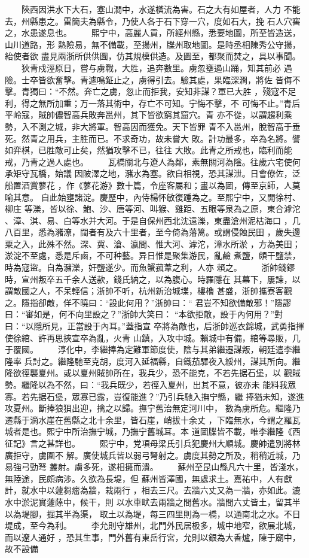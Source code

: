 \documentclass{ctexart}
\begin{document}
　　陝西因洪水下大石，塞山澗中，水遂橫流為害。石之大有如屋者，人力 不能去，州縣患之。雷簡夫為縣令，乃使人各于石下穿一穴，度如石大，挽 石人穴窖之，水患遂息也。 　　熙宁中，高麗人貢，所經州縣，悉要地圖，所至皆造送，山川道路，形 熱險易，無不備載，至揚州，牒州取地圖。是時丞相陳秀公守揚，紿使者欲 盡見兩浙所供供圖，仿其規模供造。及圖至，都聚而焚之，具以事聞。 　　狄青戍涇原日，嘗与虜戰，大胜，追奔數里。虜忽壅遏山踊，知其前必 遇險。士卒皆欲奮擊。青遽鳴鉦止之，虜得引去。驗其處，果臨深澗，將佐 皆侮不擊。青獨曰：``不然。奔亡之虜，忽止而拒我，安知非謀？軍已大胜 ，殘寇不足利，得之無所加重；万一落其術中，存亡不可知。宁悔不擊，不 可悔不止。''青后平岭寇，賊帥儂智高兵敗奔邕州，其下皆欲窮其窟穴。青 亦不從，以謂趨利乘勢，入不測之城，非大將軍。智高因而獲免。天下皆罪 青不入邕州，脫智高于垂死。然青之用兵，主胜而已。不求奇功，故未嘗大 敗。計功最多，卒為名將。譬如弈棋，已胜敵可止矣，然猶攻擊不已，往往 大敗。此青之所戒也，臨利而能戒，乃青之過人處也。 　　瓦橋關北与遼人為鄰，素無關河為陰。往歲六宅使何承矩守瓦橋，始議 因陂澤之地，瀦水為塞。欲自相視，恐其謀泄。日會僚佐，泛船置酒賞蓼花 ，作《蓼花游》數十篇，令座客屬和；畫以為圖，傳至京師，人莫喻其意。 自此始壅諸淀。慶歷中，內侍楊怀敏復踵為之。至熙宁中，又開徐村、柳庄 等濼，皆以徐、鮑、沙、唐等河、叫猴、雞距、五眼等泉為之原，東合滹沱 、漳、淇、易、白等水并大河。于是自保州西北沈遠濼，東盡滄州泥枯海口 ，几八百里，悉為瀦潦，闊者有及六十里者，至今倚為藩篱。或謂侵蝕民田 ，歲失邊粟之入，此殊不然。深、冀、滄、瀛間、惟大河、滹沱，漳水所淤 ，方為美田；淤淀不至處，悉是斥鹵，不可种藝。异日惟是聚集游民，亂鹼 煮鹽，頗干鹽禁，時為寇盜。自為瀦濼，奸鹽遂少。而魚蟹菰葦之利，人亦 賴之。 　　浙帥錢鏐時，宣州叛卒五千余人送款，錢氏納之，以為腹心。時羅隱在 其幕下，屢諫，以謂敵國之人，不呆輕信；浙帥不听，杭州新治城堞，樓櫓 甚盛，浙帥攜寮客觀之。隱指卻敵，佯不曉曰：``設此何用？''浙帥曰：`` 君豈不知欲備敵邪！''隱謬曰：``審如是，何不向里設之？''浙帥大笑曰： ``本欲拒敵，設于內何用？''對曰：``以隱所見，正當設于內耳。''蓋指宣 卒將為敵也，后浙帥巡衣錦城，武勇指揮使徐綰、許再思挾宣卒為亂，火青 山鎮，入攻中城。賴城中有備，綰等尋販，几于覆國。 　　淳化中，李繼捧為定難軍節度使，陰与其弟繼遷謀叛，朝廷遣李繼隆率 兵討之。繼隆馳至克胡，度河入延福縣，自鐵茄驛夜入綏州，謀其所向。繼 隆欲徑襲夏州。或以夏州賊帥所在，我兵少，恐不能克，不若先据石堡，以 觀賊勢。繼隆以為不然，曰：``我兵既少，若徑入夏州，出其不意，彼亦未 能料我眾寡。若先据石堡，眾寡已露，豈復能進？''乃引兵馳入撫宁縣，繼 捧猶未知，遂進攻夏州。斷捧狼狽出迎，擒之以歸。撫宁舊治無定河川中， 數為虜所危。繼隆乃遷縣于滴水崖在舊縣之北十余里，皆石崖，峭拔十余丈 ，下臨無水，今謂之羅瓦城者是也。熙宁中所治撫宁城，乃撫宁舊城耳。本 道圖牒皆不載，唯李繼隆《西征記》言之甚詳也。 　　熙宁中，党項母梁氏引兵犯慶州大順城。慶帥遣別將林廣拒守，虜圍不 解。廣使城兵皆以弱弓弩射之。虜度其勢之所及，稍稍近城，乃易強弓勁弩 叢射。虜多死，遂相擁而潰。 　　蘇州至昆山縣凡六十里，皆淺水，無陸途，民頗病涉。久欲為長堤，但 蘇州皆澤國，無處求土。嘉祐中，人有獻計，就水中以蘧芻癗為牆，栽兩行 ，相去三尺。去牆六丈又為一牆，亦如此。漉水中淤泥實蘧蒢中，候干，則 以水車畎去兩牆之間舊水。牆間六丈皆土，留其半以為堤腳，掘其半為渠， 取土以為堤，每三四里則為一橋，以通南北之水。不日堤成，至今為利。 　　李允則守雄州，北門外民居极多，城中地窄，欲展北城，而以遼人通好 ，恐其生事，門外舊有東岳行宮，允則以銀為大香爐，陳于廟中，故不設備 
\end{document}
